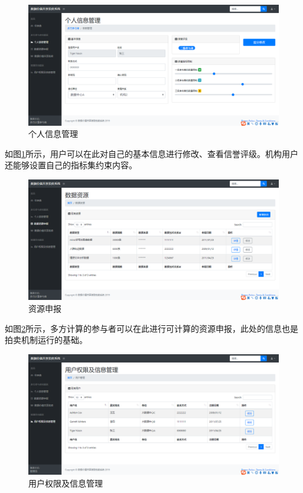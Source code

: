 \documentclass[promaster]{thesis-uestc}
\begin{document}
\begin{figure}[H]
    \includegraphics[width=400pt]{ui/gerenxinxiguanli.png}
    \caption{个人信息管理}
    \label{gerenxinxi}
\end{figure}

如图\ref{gerenxinxi}所示，用户可以在此对自己的基本信息进行修改、查看信誉评级。机构用户还能够设置自己的指标集约束内容。

\begin{figure}[H]
    \includegraphics[width=400pt]{ui/ziyuanshenbao.png}
    \caption{资源申报}
    \label{ziyuanshenbao}
\end{figure}

如图\ref{ziyuanshenbao}所示，多方计算的参与者可以在此进行可计算的资源申报，此处的信息也是拍卖机制运行的基础。

\begin{figure}[H]
    \includegraphics[width=400pt]{ui/yonghuguanli.png}
    \caption{用户权限及信息管理}
    \label{yonghuguanli}
\end{figure}
\end{document}
